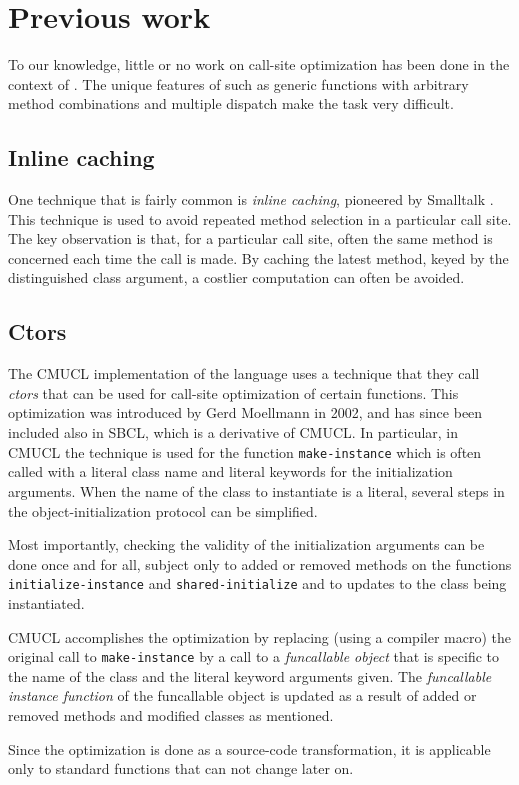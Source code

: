 \section{Previous work}

To our knowledge, little or no work on call-site optimization has been
done in the context of \commonlisp{}.  The unique features of
\commonlisp{} such as generic functions with arbitrary method
combinations and multiple dispatch make the task very difficult.

\subsection{Inline caching}

One technique that is fairly common is \emph{inline caching},
pioneered by Smalltalk \cite{Deutsch:1984:ES}.  This technique is used
to avoid repeated method selection in a particular call site.  The key
observation is that, for a particular call site, often the same method
is concerned each time the call is made.  By caching the latest
method, keyed by the distinguished class argument, a costlier
computation can often be avoided.

\subsection{Ctors}
\label{sec-previous-ctors}

The CMUCL implementation of the \commonlisp{} language uses a
technique that they call \emph{ctors} that can be used for call-site
optimization of certain functions.  This optimization was introduced
by Gerd Moellmann in 2002, and has since been included also in SBCL,
which is a derivative of CMUCL.  In particular, in CMUCL the technique
is used for the function \texttt{make-instance} which is often called
with a literal class name and literal keywords for the initialization
arguments.  When the name of the class to instantiate is a literal,
several steps in the object-initialization protocol can be simplified.

Most importantly, checking the validity of the initialization
arguments can be done once and for all, subject only to added or
removed methods on the functions \texttt{initialize-instance} and
\texttt{shared-initialize} and to updates to the class being
instantiated.

CMUCL accomplishes the optimization by replacing (using a compiler
macro) the original call to \texttt{make-instance} by a call to a
\emph{funcallable object} that is specific to the name of the class
and the literal keyword arguments given.  The \emph{funcallable
  instance function} of the funcallable object is updated as a result
of added or removed methods and modified classes as mentioned.

Since the optimization is done as a source-code transformation, it is
applicable only to standard functions that can not change later on.

